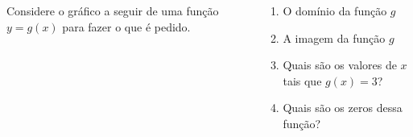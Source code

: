 \begin{frame}
  \begin{columns}[onlytextwidth]
    \begin{column}{0.49\textwidth}
      \begin{example}
        Considere o gráfico a seguir de uma função $y=g(x)$ para fazer o que é pedido.
      \end{example}
      \vspace*{-0.25cm}
      \begin{figure}
      \end{figure}
    \end{column}
    \begin{column}{0.49\textwidth}
      \begin{highlight}
        \begin{enumerate}
          \item O domínio da função $g$
          \item A imagem da função $g$
          \item Quais são os valores de $x$ tais que $g(x) = 3$?
          \item Quais são os zeros dessa função?
        \end{enumerate}
      \end{highlight}
    \end{column}
  \end{columns}
\end{frame}

